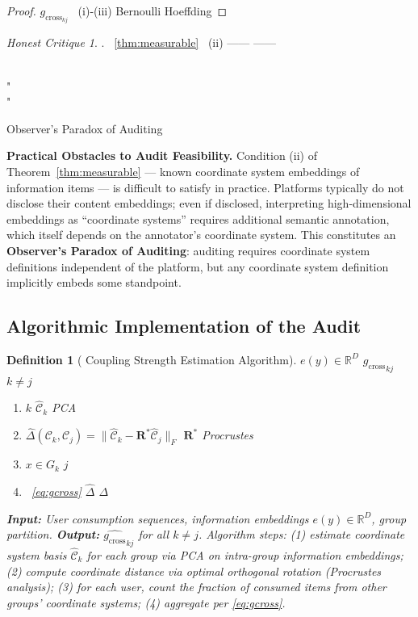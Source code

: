 \documentclass[11pt,a4paper]{article}
\newtheorem{definition}[theorem]{Definition}
\theoremstyle{remark}
\newtheorem{honestattack}{Honest Critique}
\newenvironment{attackbox}{%
  \begin{center}
  \color{red}
  \begin{minipage}{0.92\textwidth}
  \begin{honestattack}
}{%
  \end{honestattack}
  \end{minipage}
  \end{center}
}
\newcommand{\R}{\mathbb{R}}
\newcommand{\GCoupling}{g_{\text{cross}}}
\newcommand{\CoordSys}{\mathcal{C}}
\begin{document}
\begin{proof}
$\GCoupling_{kj}$ 
~(i)-(iii)  Bernoulli 
Hoeffding 
\end{proof}

\begin{attackbox}
  \textbf{}.
  ~\ref{thm:measurable} ~(ii) ——  ——
  
  \\"\\"
  
  \textbf{}Observer's Paradox of Auditing
  

  \textbf{Practical Obstacles to Audit Feasibility.}
  Condition (ii) of Theorem~\ref{thm:measurable} --- known coordinate system embeddings
  of information items --- is difficult to satisfy in practice. Platforms typically do
  not disclose their content embeddings; even if disclosed, interpreting high-dimensional
  embeddings as ``coordinate systems'' requires additional semantic annotation, which
  itself depends on the annotator's coordinate system. This constitutes an
  \textbf{Observer's Paradox of Auditing}: auditing requires coordinate system definitions
  independent of the platform, but any coordinate system definition implicitly embeds
  some standpoint.
\end{attackbox}

\subsection{}

\subsection{Algorithmic Implementation of the Audit}

\begin{definition}[ Coupling Strength Estimation Algorithm]
\label{def:auditalg}
\textbf{}  $e(y) \in \R^D$
\textbf{} $\widehat{\GCoupling}_{kj}$  $k \neq j$

\begin{enumerate}[label= \arabic*:, leftmargin=*]
\item  $k$  $\widehat{\CoordSys}_k$ PCA
\item  $\widehat{\Delta}(\CoordSys_k, \CoordSys_j) = \|\widehat{\CoordSys}_k - \mathbf{R}^*\widehat{\CoordSys}_j\|_F$
 $\mathbf{R}^*$  Procrustes 
\item  $x \in G_k$ $j$ 
\item ~\eqref{eq:gcross}  $\widehat{\Delta}$  $\Delta$
\end{enumerate}

\textbf{Input:} User consumption sequences, information embeddings $e(y) \in \R^D$, group
partition. \textbf{Output:} $\widehat{\GCoupling}_{kj}$ for all $k \neq j$.
Algorithm steps: (1) estimate coordinate system basis $\widehat{\CoordSys}_k$ for each
group via PCA on intra-group information embeddings; (2) compute coordinate distance
via optimal orthogonal rotation (Procrustes analysis); (3) for each user, count the
fraction of consumed items from other groups' coordinate systems; (4) aggregate per
\eqref{eq:gcross}.
\end{definition}
\end{document}
